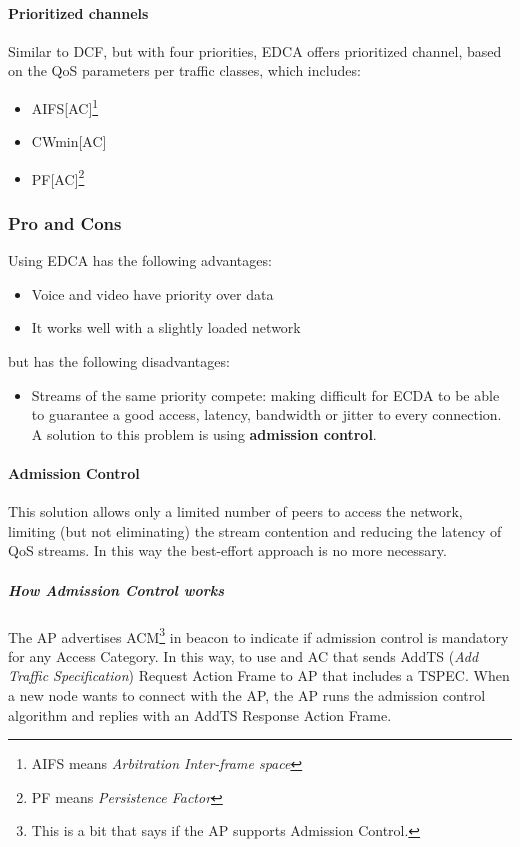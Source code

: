 \paragraph*{Prioritized channels} Similar to DCF, but with four priorities, EDCA
offers prioritized channel, based on the QoS parameters per traffic classes,
which includes:
\begin{itemize}
\item AIFS[AC]\footnote{AIFS means \textit{Arbitration Inter-frame space}}
\item CWmin[AC]
\item PF[AC]\footnote{PF means \textit{Persistence Factor}}
\end{itemize}

\subsubsection{Pro and Cons}

Using EDCA has the following advantages:
\begin{itemize}
\item Voice and video have priority over data
\item It works well with a slightly loaded network
\end{itemize}
but has the following disadvantages:
\begin{itemize}
\item Streams of the same priority compete: making difficult for ECDA to be able
  to guarantee a good access, latency, bandwidth or jitter to every connection.
A solution to this problem is using \textbf{admission control}.
\end{itemize}

\paragraph*{Admission Control} This solution allows only a limited number of
peers to access the network, limiting (but not eliminating) the stream
contention and reducing the latency of QoS streams.
In this way the best-effort approach is no more necessary.
\subparagraph*{How Admission Control works} The AP advertises ACM\footnote{This
is a bit that says if the AP supports Admission Control.} in beacon to indicate
if admission control is mandatory for any Access Category. In this way, to use
and AC that  sends AddTS (\textit{Add Traffic Specification}) Request Action
Frame to AP that includes a TSPEC.
When a new node wants to connect with the AP, the AP runs the admission control
algorithm and replies with an AddTS Response Action Frame.

